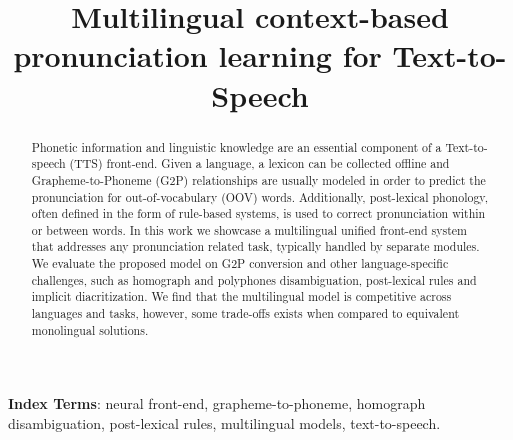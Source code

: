 \documentclass{INTERSPEECH2023}
\title{Multilingual context-based pronunciation learning for Text-to-Speech}
\begin{document}
\maketitle
 
\begin{abstract}
Phonetic information and linguistic knowledge are an essential component of a Text-to-speech (TTS) front-end. Given a language, a lexicon can be collected offline and Grapheme-to-Phoneme (G2P) relationships are usually modeled in order to predict the pronunciation for out-of-vocabulary (OOV) words. Additionally, post-lexical phonology, often defined in the form of rule-based systems, is used to correct pronunciation within or between words. 
In this work we showcase a multilingual unified front-end system that addresses any pronunciation related task, typically handled by separate modules. We evaluate the proposed model on G2P conversion and other language-specific challenges, such as homograph and polyphones disambiguation, post-lexical rules and implicit diacritization. We find that the multilingual model is competitive across languages and tasks, however, some trade-offs exists when compared to equivalent monolingual solutions.

\end{abstract}
\noindent\textbf{Index Terms}: neural front-end, 
grapheme-to-phoneme, homograph disambiguation, post-lexical rules, multilingual models, text-to-speech.







\end{document}

